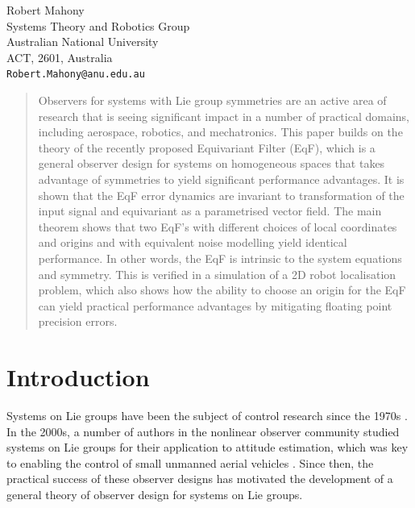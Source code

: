 \documentclass{article}
\begin{document}
{{    Robert Mahony}
\\
    Systems Theory and Robotics Group \\
	Australian National University \\
    ACT, 2601, Australia \\
	\texttt{Robert.Mahony@anu.edu.au} \\
}

\maketitle

\vspace{1cm}


\begin{abstract}
Observers for systems with Lie group symmetries are an active area of research that is seeing significant impact in a number of practical domains, including aerospace, robotics, and mechatronics.
This paper builds on the theory of the recently proposed Equivariant Filter (EqF), which is a general observer design for systems on homogeneous spaces that takes advantage of symmetries to yield significant performance advantages.
It is shown that the EqF error dynamics are invariant to transformation of the input signal and equivariant as a parametrised vector field.
The main theorem shows that two EqF's with different choices of local coordinates and origins and with equivalent noise modelling yield identical performance.
In other words, the EqF is intrinsic to the system equations and symmetry.
This is verified in a simulation of a 2D robot localisation problem, which also shows how the ability to choose an origin for the EqF can yield practical performance advantages by mitigating floating point precision errors.
\end{abstract} %

\section{Introduction}

Systems on Lie groups have been the subject of control research since the 1970s \citep{brockett1972system,jurdjevic1972control,brockett1973lie}.
In the 2000s, a number of authors in the nonlinear observer community studied systems on Lie groups for their application to attitude estimation, which was key to enabling the control of small unmanned aerial vehicles \citep{salcudean1991globally,thienel2003coupled,mahony2008nonlinear}.
Since then, the practical success of these observer designs has motivated the development of a general theory of observer design for systems on Lie groups.
\end{document}
